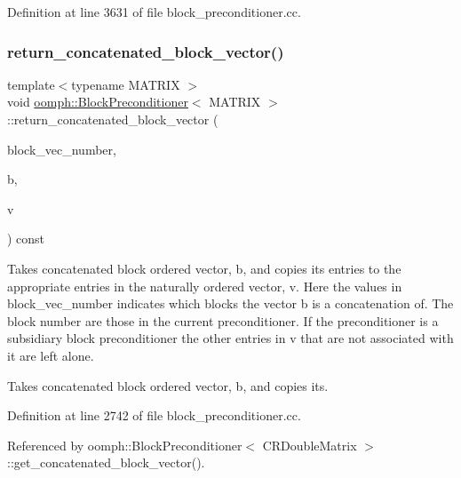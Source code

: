Definition at line 3631 of file block\+\_\+preconditioner.\+cc.

\mbox{\label{classoomph_1_1BlockPreconditioner_a6d5106c0b9dca23aa1cc7f7fd8e696cb}} 
\subsubsection{\texorpdfstring{return\+\_\+concatenated\+\_\+block\+\_\+vector()}{return\_concatenated\_block\_vector()}}
{\footnotesize\ttfamily template$<$typename M\+A\+T\+R\+IX $>$ \\
void \hyperlink{classoomph_1_1BlockPreconditioner}{oomph\+::\+Block\+Preconditioner}$<$ M\+A\+T\+R\+IX $>$\+::return\+\_\+concatenated\+\_\+block\+\_\+vector (\begin{DoxyParamCaption}\item[{const \hyperlink{classoomph_1_1Vector}{Vector}$<$ unsigned $>$ \&}]{block\+\_\+vec\+\_\+number,  }\item[{const \hyperlink{classoomph_1_1DoubleVector}{Double\+Vector} \&}]{b,  }\item[{\hyperlink{classoomph_1_1DoubleVector}{Double\+Vector} \&}]{v }\end{DoxyParamCaption}) const}



Takes concatenated block ordered vector, b, and copies its entries to the appropriate entries in the naturally ordered vector, v. Here the values in block\+\_\+vec\+\_\+number indicates which blocks the vector b is a concatenation of. The block number are those in the current preconditioner. If the preconditioner is a subsidiary block preconditioner the other entries in v that are not associated with it are left alone. 

Takes concatenated block ordered vector, b, and copies its. 

Definition at line 2742 of file block\+\_\+preconditioner.\+cc.



Referenced by oomph\+::\+Block\+Preconditioner$<$ C\+R\+Double\+Matrix $>$\+::get\+\_\+concatenated\+\_\+block\+\_\+vector().

